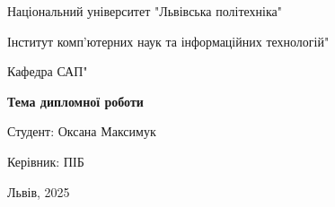 \begin{titlepage}
    \centering
    {\Large Національний університет "Львівська політехніка"\par}
    {\Large Інститут комп'ютерних наук та інформаційних технологій"\par}
    {\raggedright Кафедра САП"\par}
    \vspace{2cm}
    {\Huge \textbf{Тема дипломної роботи}\par}
    \vfill
    {\raggedright Студент: Оксана Максимук\par}
    {\raggedright Керівник: ПІБ\par}
    \vspace{2cm}
    {\large Львів, 2025\par}
\end{titlepage}

